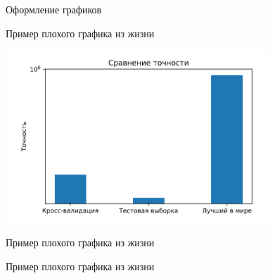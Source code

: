 \documentclass[fleqn, xcolor=x11names]{beamer}
\begin{document}
\begin{section}{Оформление графиков}
\begin{frame}{Пример плохого графика из жизни}
	\begin{center}
		\includegraphics[height=6.5cm]{missing_ticks.png}
	\end{center}
\end{frame}

\begin{frame}{Пример плохого графика из жизни}
	\begin{center}
	\end{center}
\end{frame}

\begin{frame}{Пример плохого графика из жизни}
    \begin{center}
    \end{center}
\end{frame}


\end{section}
\end{document}
